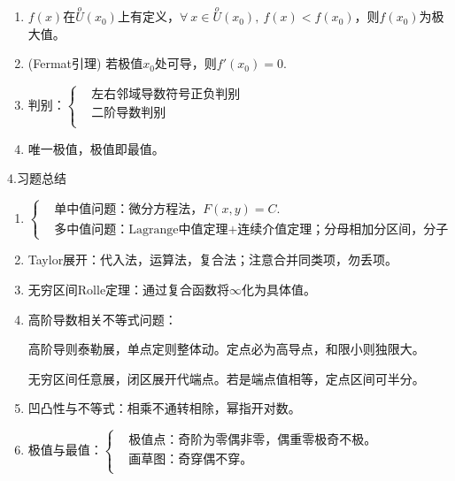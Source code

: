 \documentclass[UTF8]{ctexart}
\newcommand\no{\noindent}
\begin{document}
\begin{spacing}{2}
\begin{enumerate}[itemindent=1.4em, label=(\arabic*)]

\item $f(x)$在$\overset{o}{U} (x_0)$上有定义，$\forall \ x\in \overset{o}{U}(x_0),
\ f(x)<f(x_0)$，则$f(x_0)$为极大值。

\item (Fermat引理) 若极值$x_0$处可导，则$f'(x_0)=0.$

\item $\text{判别：}\left\{\begin{aligned}
&\text{左右邻域导数符号正负判别}\\
&\text{二阶导数判别}\\
\end{aligned}\right.$

\item 唯一极值，极值即最值。

\end{enumerate}

\no4.习题总结

\begin{enumerate}[itemindent=1.4em, label=(\arabic*)]

\item $\left\{\begin{aligned}
&\text{单中值问题：微分方程法，} F(x,y)=C.\\
&\text{多中值问题：Lagrange中值定理+连续介值定理；分母相加分区间，分子相加分函值。}
\end{aligned}\right.$

\item Taylor展开：代入法，运算法，复合法；注意合并同类项，勿丢项。

\item 无穷区间Rolle定理：通过复合函数将$\infty$化为具体值。

\item 高阶导数相关不等式问题：

高阶导则泰勒展，单点定则整体动。定点必为高导点，和限小则独限大。

无穷区间任意展，闭区展开代端点。若是端点值相等，定点区间可半分。

\item 凹凸性与不等式：相乘不通转相除，幂指开对数。

\item $\text{极值与最值：}\left\{\begin{aligned}
&\text{极值点：奇阶为零偶非零，偶重零极奇不极。}\\
&\text{画草图：奇穿偶不穿。}\\
\end{aligned}\right.$
\end{enumerate}


\end{spacing}
\end{document}
